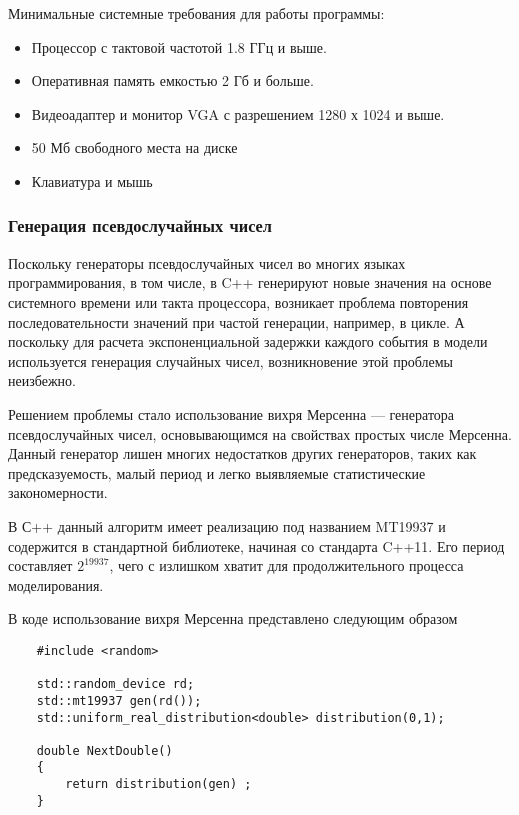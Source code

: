 Минимальные системные требования для работы программы:
\begin{itemize}
	\item Процессор с тактовой частотой 1.8 ГГц и выше.
	\item Оперативная память емкостью 2 Гб и больше.
	\item Видеоадаптер и монитор VGA с разрешением 1280 х 1024 и выше.
	\item 50 Мб свободного места на диске
	\item Клавиатура и мышь
	\end{itemize}

\subsubsection{Генерация псевдослучайных чисел}
Поскольку генераторы псевдослучайных чисел во многих языках программирования, в том числе, в C++ генерируют новые значения на основе системного времени или такта процессора, возникает проблема повторения последовательности значений при частой генерации, например, в цикле. А поскольку для расчета экспоненциальной задержки каждого события в модели используется генерация случайных чисел, возникновение этой проблемы неизбежно.

Решением проблемы стало использование вихря Мерсенна --- генератора псевдослучайных чисел, основывающимся на свойствах простых числе Мерсенна. Данный генератор лишен многих недостатков других генераторов, таких как предсказуемость, малый период и легко выявляемые статистические закономерности.

В С++ данный алгоритм имеет реализацию под названием MT19937 и содержится в стандартной библиотеке, начиная со стандарта C++11. Его период составляет $2^{19937}$, чего с излишком хватит для продолжительного процесса моделирования. 

В коде использование вихря Мерсенна представлено следующим образом
\begin{lstlisting}
	#include <random>
	
	std::random_device rd;
	std::mt19937 gen(rd());
	std::uniform_real_distribution<double> distribution(0,1);
	
	double NextDouble()
	{
		return distribution(gen) ;
	}
\end{lstlisting}

